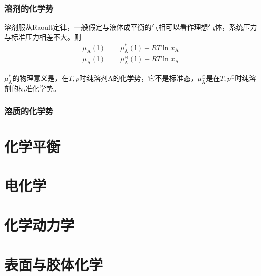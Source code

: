 \documentclass[lang=cn,newtx,10pt,scheme=chinese]{elegantbook}
\begin{document}
\subsection{溶剂的化学势}
溶剂服从Raoult定律，一般假定与液体成平衡的气相可以看作理想气体，系统压力与标准压力相差不大。则
\begin{equation}
	\begin{aligned}
		\mu_\mathrm{A}(\mathrm{l}) &= \mu^*_\mathrm{A}(\mathrm{l}) + RT \ln x_\mathrm{A} \\
		\mu_\mathrm{A}(\mathrm{l}) &= \mu^\ominus _\mathrm{A}(\mathrm{l}) + RT \ln x_\mathrm{A} 
	\end{aligned}
\end{equation}

$\mu^*_\mathrm{A}$的物理意义是，在$T,p$时纯溶剂A的化学势，它不是标准态，$\mu^\ominus_\mathrm{A}$是在$T,p^\ominus$时纯溶剂的标准化学势。

\subsection{溶质的化学势}



\chapter{化学平衡}
\chapter{电化学}
\chapter{化学动力学}
\chapter{表面与胶体化学}
\end{document}
